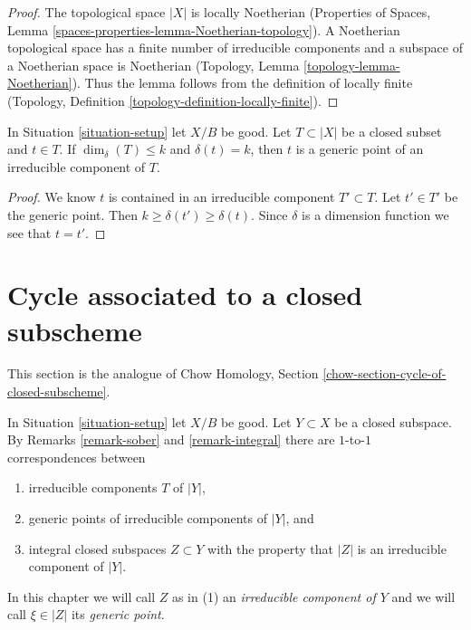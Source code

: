 \begin{proof}
The topological space $|X|$ is locally Noetherian
(Properties of Spaces, Lemma \ref{spaces-properties-lemma-Noetherian-topology}).
A Noetherian topological space has a finite number of
irreducible components and a subspace of a Noetherian space is Noetherian
(Topology, Lemma \ref{topology-lemma-Noetherian}).
Thus the lemma follows from the definition of locally finite
(Topology, Definition \ref{topology-definition-locally-finite}).
\end{proof}

\begin{lemma}
\label{lemma-point-of-max-dimension}
In Situation \ref{situation-setup} let $X/B$ be good.
Let $T \subset |X|$ be a closed subset and $t \in T$.
If $\dim_\delta(T) \leq k$ and $\delta(t) = k$, then
$t$ is a generic point of an irreducible component of $T$.
\end{lemma}

\begin{proof}
We know $t$ is contained in an irreducible component $T' \subset T$.
Let $t' \in T'$ be the generic point. Then
$k \geq \delta(t') \geq \delta(t)$. Since $\delta$ is a dimension
function we see that $t = t'$.
\end{proof}



\section{Cycle associated to a closed subscheme}
\label{section-cycle-of-closed-subscheme}

\noindent
This section is the analogue of
Chow Homology, Section \ref{chow-section-cycle-of-closed-subscheme}.

\begin{remark}
\label{remark-irreducible-component}
In Situation \ref{situation-setup} let $X/B$ be good.
Let $Y \subset X$ be a closed subspace. By
Remarks \ref{remark-sober} and \ref{remark-integral}
there are $1$-to-$1$ correspondences between
\begin{enumerate}
\item irreducible components $T$ of $|Y|$,
\item generic points of irreducible components of $|Y|$, and
\item integral closed subspaces $Z \subset Y$ with the property that
$|Z|$ is an irreducible component of $|Y|$.
\end{enumerate}
In this chapter we will call $Z$ as in (1) an
{\it irreducible component of $Y$}
and we will call $\xi \in |Z|$ its {\it generic point}.
\end{remark}

